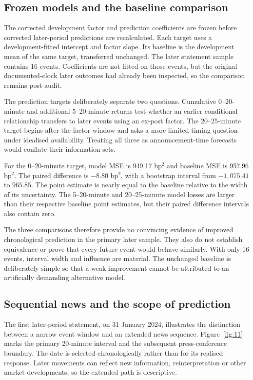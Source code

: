 \label{sec:transfer}
\subsection{Frozen models and the baseline comparison}
The corrected development factor and prediction coefficients are frozen before corrected later-period predictions are recalculated. Each target uses a development-fitted intercept and factor slope. Its baseline is the development mean of the same target, transferred unchanged. The later statement sample contains 16 events. Coefficients are not fitted on those events, but the original documented-clock later outcomes had already been inspected, so the comparison remains post-audit.

The prediction targets deliberately separate two questions. Cumulative 0--20-minute and additional 5--20-minute returns test whether an earlier conditional relationship transfers to later events using an ex-post factor. The 20--25-minute target begins after the factor window and asks a more limited timing question under idealised availability. Treating all three as announcement-time forecasts would conflate their information sets.


For the 0--20-minute target, model MSE is 949.17 bp$^2$ and baseline MSE is 957.96 bp$^2$. The paired difference is $-8.80$ bp$^2$, with a bootstrap interval from $-1{,}075.41$ to $965.85$. The point estimate is nearly equal to the baseline relative to the width of its uncertainty. The 5--20-minute and 20--25-minute model losses are larger than their respective baseline point estimates, but their paired difference intervals also contain zero.

The three comparisons therefore provide no convincing evidence of improved chronological prediction in the primary later sample. They also do not establish equivalence or prove that every future event would behave similarly. With only 16 events, interval width and influence are material. The unchanged baseline is deliberately simple so that a weak improvement cannot be attributed to an artificially demanding alternative model.

\subsection{Sequential news and the scope of prediction}
The first later-period statement, on 31 January 2024, illustrates the distinction between a narrow event window and an extended news sequence. Figure~\ref{fig:11} marks the primary 20-minute interval and the subsequent press-conference boundary. The date is selected chronologically rather than for its realised response. Later movements can reflect new information, reinterpretation or other market developments, so the extended path is descriptive.

